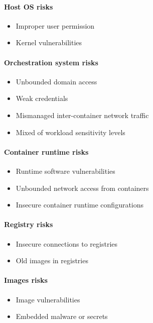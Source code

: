 \documentclass[12pt,a4paper]{IEEEconf}
\begin{document}
\paragraph{Host OS risks}
\begin{itemize}
  \item Improper user permission
  \item Kernel vulnerabilities
\end{itemize}

\paragraph{Orchestration system risks}
\begin{itemize}
  \item Unbounded domain access
  \item Weak credentials
  \item Mismanaged inter-container network traffic
  \item Mixed of workload sensitivity levels
\end{itemize}

\paragraph{Container runtime risks}
\begin{itemize}
  \item Runtime software vulnerabilities
  \item Unbounded network access from containers
  \item Insecure container runtime configurations
\end{itemize}

\paragraph{Registry risks}
\begin{itemize}
  \item Insecure connections to registries
  \item Old images in registries
\end{itemize}

\paragraph{Images risks}
\begin{itemize}
  \item Image vulnerabilities
  \item Embedded malware or secrets
\end{itemize}
\end{document}
